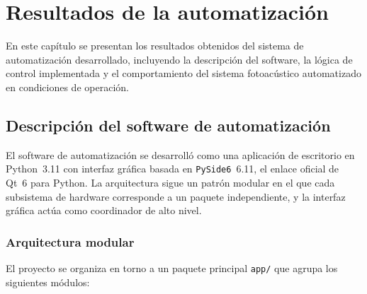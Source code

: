 \chapter{Resultados de la automatización}
\label{cap:resultados}

En este capítulo se presentan los resultados obtenidos del sistema
de automatización desarrollado, incluyendo la descripción del software,
la lógica de control implementada y el comportamiento del sistema
fotoacústico automatizado en condiciones de operación.

\section{Descripción del software de automatización}
\label{sec:software}

El software de automatización se desarrolló como una aplicación de
escritorio en Python~3.11 con interfaz gráfica basada en
\texttt{PySide6}~6.11, el enlace oficial de Qt~6 para Python.
La arquitectura sigue un patrón modular en el que cada subsistema
de hardware corresponde a un paquete independiente, y la interfaz
gráfica actúa como coordinador de alto nivel.

\subsection*{Arquitectura modular}

El proyecto se organiza en torno a un paquete principal \texttt{app/}
que agrupa los siguientes módulos:

